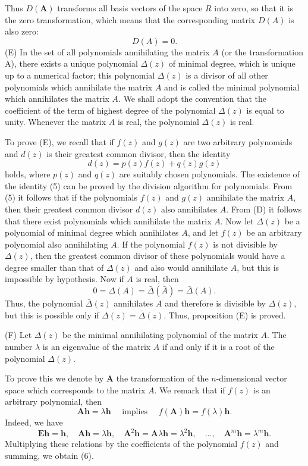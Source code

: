 \documentclass[10pt,a5paper]{book}
\theoremstyle{plain}
\theoremstyle{definition}
\theoremstyle{remark}
\begin{document}
Thus $D(\mathbf{A})$ transforms all basis vectors of the space $R$ into zero, so that it is the zero transformation, which means that the corresponding matrix $D(A)$ is also zero:
\[
D(A)=0 .
\]
(E) In the set of all polynomials annihilating the matrix $A$ (or the transformation A), there exists a unique polynomial $\Delta(z)$ of minimal degree, which is unique up to a numerical factor; this polynomial $\Delta(z)$ is a divisor of all other polynomials which annihilate the matrix $A$ and is called the minimal polynomial which annihilates the matrix $A$. We shall adopt the convention that the coefficient of the term of highest degree
of the polynomial $\Delta(z)$ is equal to unity. Whenever the matrix $A$ is real, the polynomial $\Delta(z)$ is real.

To prove (E), we recall that if $f(z)$ and $g(z)$ are two arbitrary polynomials and $d(z)$ is their greatest common divisor, then the identity
\begin{equation*}
d(z)=p(z) f(z)+q(z) g(z) \tag{5}
\end{equation*}
holds, where $p(z)$ and $q(z)$ are suitably chosen polynomials. The existence of the identity (5) can be proved by the division algorithm for polynomials. From (5) it follows that if the polynomials $f(z)$ and $g(z)$ annihilate the matrix $A$, then their greatest common divisor $d(z)$ also annihilates $A$. From (D) it follows that there exist polynomials which annihilate the matrix $A$. Now let $\Delta(z)$ be a polynomial of minimal degree which annihilates $A$, and let $f(z)$ be an arbitrary polynomial also annihilating $A$. If the polynomial $f(z)$ is not divisible by $\Delta(z)$, then the greatest common divisor of these polynomials would have a degree smaller than that of $\Delta(z)$ and also would annihilate $A$, but this is impossible by hypothesis. Now if $A$ is real, then
\[
0=\overline{\Delta(A)}=\bar{\Delta}(\bar{A})=\bar{\Delta}(A) .
\]
Thus, the polynomial $\bar{\Delta}(z)$ annihilates $A$ and therefore is divisible by $\Delta(z)$, but this is possible only if $\Delta(z)=\bar{\Delta}(z)$. Thus, proposition (E) is proved.

(F) Let $\Delta(z)$ be the minimal annihilating polynomial of the matrix $A$. The number $\lambda$ is an eigenvalue of the matrix $A$ if and only if it is a root of the polynomial $\Delta(z)$.

To prove this we denote by $\mathbf{A}$ the transformation of the $n$-dimensional vector space which corresponds to the matrix $A$. We remark that if $f(z)$ is an arbitrary polynomial, then
\begin{equation*}
\mathbf{A h}=\lambda \mathbf{h} \quad \text { implies } \quad f(\mathbf{A}) \mathbf{h}=f(\lambda) \mathbf{h} . \tag{6}
\end{equation*}
Indeed, we have
\[
\mathbf{E} \mathbf{h}=\mathbf{h}, \quad \mathbf{A h}=\lambda \mathbf{h}, \quad \mathbf{A}^{2} \mathbf{h}=\mathbf{A} \lambda \mathbf{h}=\lambda^{2} \mathbf{h}, \quad \ldots, \quad \mathbf{A}^{m} \mathbf{h}=\lambda^{m} \mathbf{h} .
\]
Multiplying these relations by the coefficients of the polynomial $f(z)$ and summing, we obtain (6).
\end{document}
